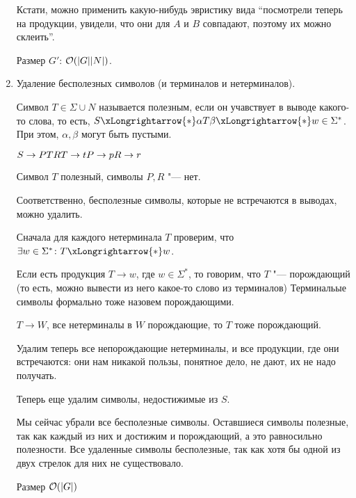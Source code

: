 \begin{enumerate}
\begin{exmp}
Кстати, можно применить какую-нибудь эвристику вида ``посмотрели теперь на продукции, увидели, что они для $A$ и $B$ совпадают, поэтому их можно склеить''.
\end{exmp}

Размер $G'$: $\mathcal{O}(|G| |N|)$.

\item
Удаление бесполезных символов (и терминалов и нетерминалов).

Символ $T \in \Sigma \cup N$ называется полезным, если он учавствует в выводе какого-то слова, то есть, $S \xLongrightarrow{*} \alpha T \beta \xLongrightarrow{*} w \in \Sigma^*$. 
При этом, $\alpha, \beta$ могут быть пустыми.
\begin{exmp}
$S \to PTR \\
T \to t \\
P \to p \\
R \to r$

Символ $T$ полезный, символы $P, R$ "--- нет.
\end{exmp}
Соответственно, бесполезные символы, которые не встречаются в выводах, можно удалить.

Сначала для каждого нетерминала $T$ проверим, что $\exists w \in \Sigma^*\colon T \xLongrightarrow{*} w$.

Если есть продукция $T \to w$, где $w \in \Sigma^*$, то говорим, что $T$ "--- порождающий (то есть, можно вывести из него какое-то слово из терминалов)
Терминальые символы формально тоже назовем порождающими.

$T \to W$, все нетерминалы в $W$ порождающие, то $T$ тоже порождающий.                                              

Удалим теперь все непорождающие нетерминалы, и все продукции, где они встречаются: они нам никакой пользы, понятное дело, не дают, их не надо получать.

Теперь еще удалим символы, недостижимые из $S$.

Мы сейчас убрали все бесполезные символы. 
Оставшиеся символы полезные, так как каждый из них и достижим и порождающий, а это равносильно полезности.
Все удаленные символы бесполезные, так как хотя бы одной из двух стрелок для них не существовало.

Размер $\mathcal{O}(|G|)$
\end{enumerate}


